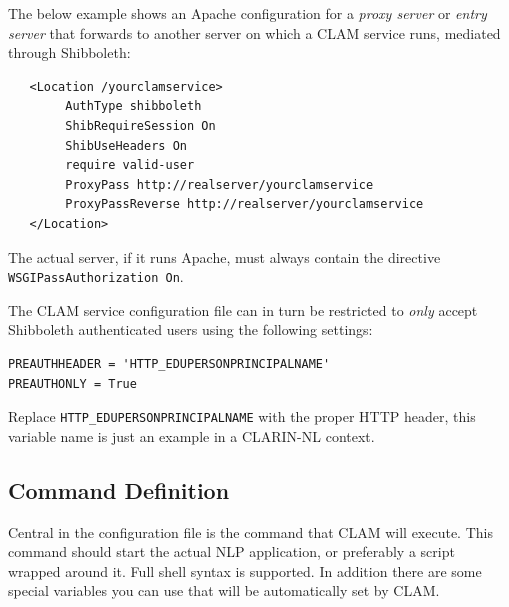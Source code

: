 \documentclass[a4paper,12pt]{report}
\begin{document}
The below example shows an Apache configuration for a \emph{proxy server} or
\emph{entry server} that forwards to another server on which a CLAM service runs, mediated
through Shibboleth:

\begin{verbatim}
   <Location /yourclamservice>
        AuthType shibboleth
        ShibRequireSession On
        ShibUseHeaders On
        require valid-user
        ProxyPass http://realserver/yourclamservice
        ProxyPassReverse http://realserver/yourclamservice
   </Location>
\end{verbatim}

The actual server, if it runs Apache, must always contain the directive
\texttt{WSGIPassAuthorization On}.

The CLAM service configuration file can in turn be restricted to \emph{only}
accept Shibboleth authenticated users using the following settings:

\begin{verbatim}
PREAUTHHEADER = 'HTTP_EDUPERSONPRINCIPALNAME'
PREAUTHONLY = True
\end{verbatim}

Replace \texttt{HTTP\_EDUPERSONPRINCIPALNAME} with the proper HTTP header, this
variable name is just an example in a CLARIN-NL context.


\subsection{Command Definition} \label{sec:command}

Central in the configuration file is the command that CLAM will execute. This
command should start the actual NLP application, or preferably a script wrapped
around it. Full shell syntax is supported. In addition there are some special
variables you can use that will be automatically set by CLAM. 
\end{document}
